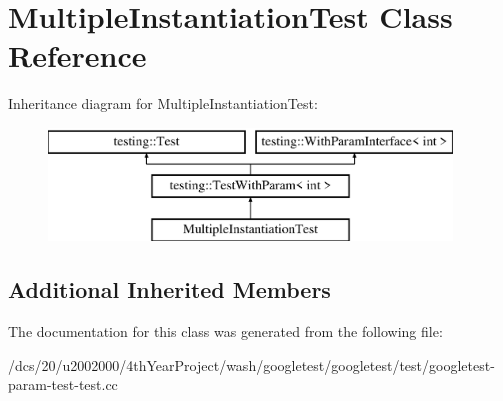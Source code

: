 \hypertarget{classMultipleInstantiationTest}{}\section{Multiple\+Instantiation\+Test Class Reference}
\label{classMultipleInstantiationTest}
Inheritance diagram for Multiple\+Instantiation\+Test\+:\begin{figure}[H]
\begin{center}
\leavevmode
\includegraphics[height=3.000000cm]{classMultipleInstantiationTest}
\end{center}
\end{figure}
\subsection*{Additional Inherited Members}


The documentation for this class was generated from the following file\+:\begin{DoxyCompactItemize}
\item 
/dcs/20/u2002000/4th\+Year\+Project/wash/googletest/googletest/test/googletest-\/param-\/test-\/test.\+cc\end{DoxyCompactItemize}
